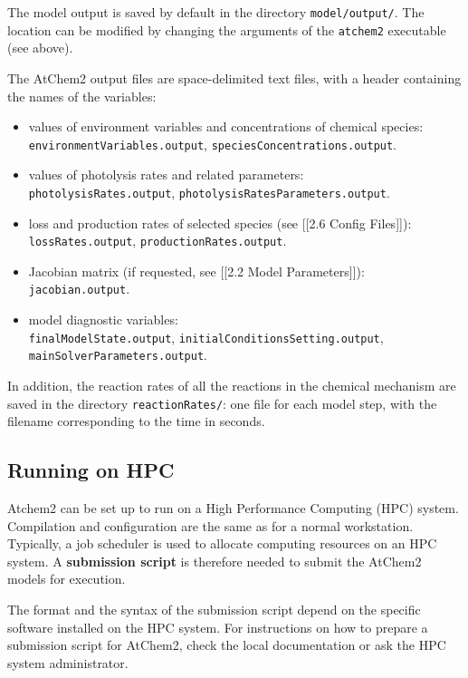 The model output is saved by default in the directory
\texttt{model/output/}. The location can be modified by changing the
arguments of the \texttt{atchem2} executable (see above).

The AtChem2 output files are space-delimited text files, with a header
containing the names of the variables:

\begin{itemize}
\item values of environment variables and concentrations of chemical
species:\\ \texttt{environmentVariables.output},
\texttt{speciesConcentrations.output}.
\item values of photolysis rates and related parameters:\\
\texttt{photolysisRates.output},
\texttt{photolysisRatesParameters.output}.
\item loss and production rates of selected species (see {[}{[}2.6
Config Files{]}{]}):\\ \texttt{lossRates.output},
\texttt{productionRates.output}.
\item Jacobian matrix (if requested, see {[}{[}2.2 Model
Parameters{]}{]}):\\ \texttt{jacobian.output}.
\item model diagnostic variables:\\ \texttt{finalModelState.output},
\texttt{initialConditionsSetting.output},
\texttt{mainSolverParameters.output}.
\end{itemize}

In addition, the reaction rates of all the reactions in the chemical
mechanism are saved in the directory \texttt{reactionRates/}: one file
for each model step, with the filename corresponding to the time in
seconds.

\subsection{Running on HPC} \label{subsec:running-on-hpc}

Atchem2 can be set up to run on a High Performance Computing (HPC)
system. Compilation and configuration are the same as for a normal
workstation. Typically, a job scheduler is used to allocate computing
resources on an HPC system. A \textbf{submission script} is therefore
needed to submit the AtChem2 models for execution.

The format and the syntax of the submission script depend on the
specific software installed on the HPC system. For instructions on how
to prepare a submission script for AtChem2, check the local
documentation or ask the HPC system administrator.

